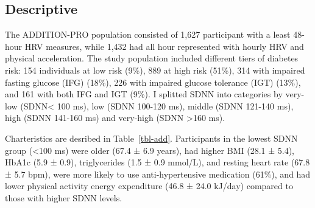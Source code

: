 \documentclass[
  a4paper,
  headsepline=true,
  open=any]{scrbook}
\begin{document}
\hypertarget{descriptive-1}{%
\subsection{Descriptive}\label{descriptive-1}}

The ADDITION-PRO population consisted of 1,627 participant with a least
48-hour HRV measures, while 1,432 had all hour represented with hourly
HRV and physical acceleration. The study population included different
tiers of diabetes risk: 154 individuals at low risk (9\%), 889 at high
risk (51\%), 314 with impaired fasting glucose (IFG) (18\%), 226 with
impaired glucose tolerance (IGT) (13\%), and 161 with both IFG and IGT
(9\%). I splitted SDNN into categories by very-low (SDNN\textless{} 100
ms), low (SDNN 100-120 ms), middle (SDNN 121-140 ms), high (SDNN 141-160
ms) and very-high (SDNN \textgreater160 ms).

Charteristics are desribed in Table~\ref{tbl-add}. Participants in the
lowest SDNN group (\textless100 ms) were older (67.4 ± 6.9 years), had
higher BMI (28.1 ± 5.4), HbA1c (5.9 ± 0.9), triglycerides (1.5 ± 0.9
mmol/L), and resting heart rate (67.8 ± 5.7 bpm), were more likely to
use anti-hypertensive medication (61\%), and had lower physical activity
energy expenditure (46.8 ± 24.0 kJ/day) compared to those with higher
SDNN levels.
\end{document}
